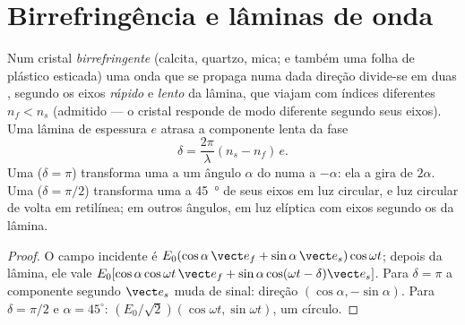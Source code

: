 \section{Birrefringência e lâminas de onda}

\begin{proposition}\label{prop:b2:plane-waves-polarization:plates}
Num cristal \emph{birrefringente} (calcita, quartzo, mica; e também uma
folha de plástico esticada) uma onda que se propaga numa dada direção
divide-se em duas , segundo os eixos \emph{rápido} e
\emph{lento} da lâmina, que viajam com índices diferentes $n_f <
n_s$ (admitido --- o cristal responde de modo diferente segundo seus eixos). Uma
lâmina de espessura $e$ atrasa a componente lenta da fase
\[
\delta = \frac{2\pi}\lambda(n_s - n_f)\,e .
\]
Uma \emph{} ($\delta = \pi$) transforma uma  a
um ângulo $\alpha$ do  numa  a $-\alpha$: ela
a gira de $2\alpha$. Uma \emph{} ($\delta = \pi/2$) transforma uma
 a \qty{45}{\degree} de seus eixos em luz circular,
e luz circular de volta em retilínea; em outros ângulos, em luz
elíptica com eixos segundo os da lâmina.
\end{proposition}

\begin{proof}
O campo incidente é $E_0(\cos\alpha\,\vect e_f + \sin\alpha\,\vect e_s)\cos\omega t$;
depois da lâmina, ele vale $E_0[\cos\alpha\cos\omega t\,\vect e_f + \sin\alpha\cos(\omega t - \delta)
\vect e_s]$. Para $\delta = \pi$ a componente segundo $\vect e_s$ muda de sinal: direção
$(\cos\alpha, -\sin\alpha)$. Para $\delta = \pi/2$ e $\alpha = 45^\circ$: $(E_0/\sqrt2)(\cos
\omega t, \sin\omega t)$, um círculo.
\end{proof}

